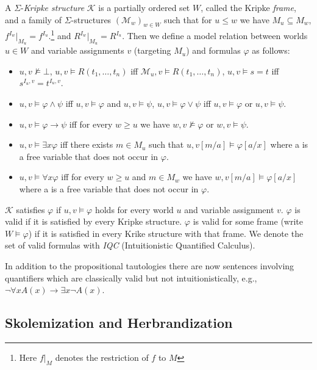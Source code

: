 \documentclass[runningheads]{llncs}
\begin{document}
\begin{definition}
	A $\Sigma$-\emph{Kripke structure} $\mathcal{K}$ is a partially ordered set $W$, called the Kripke \emph{frame}, and a family of $\Sigma$-structures $(\mathcal{M}_w)_{w\in W}$ such that for $u\leq w$ we have $M_u\subseteq M_w$, $f^{I_w}|_{M_u} = f^{I_u}$.\footnote{Here $f|_M$ denotes the restriction of $f$ to $M$} and $R^{I_w}|_{M_u} = R^{I_u}$.
	Then we define a model relation between worlds $u\in W$ and variable assignments $v$ (targeting $M_u$) and formulas $\varphi$ as follows:
	\begin{itemize}
		\item $u, v\not\models\bot$, $u, v\models R(t_1,\dots,t_n)$ iff $\mathcal M_u, v\models R(t_1,\dots,t_n)$, $u, v\models s = t$ iff $s^{I_u, v} = t^{I_u, v}$.
		\item $u, v\models \varphi\wedge \psi$ iff $u, v\models\varphi$ and $u, v\models\psi$, $u, v\models \varphi\vee\psi$ iff $u, v\models\varphi$ or $u, v\models\psi$.
		\item $u, v\models \varphi\to\psi$ iff for every $w\geq u$ we have $w, v\not\models\varphi$ or $w, v\models\psi$.
		\item $u, v\models\exists x\varphi$ iff there exists $m\in M_u$ such that $u, v[m/a]\models\varphi[a/x]$ where a is a free variable that does not occur in $\varphi$.
		\item $u, v\models\forall x\varphi$ iff for every $w\geq u$ and $m\in M_w$ we have $w, v[m/a]\models\varphi[a/x]$ where a is a free variable that does not occur in $\varphi$.
	\end{itemize}
	$\mathcal{K}$ satisfies $\varphi$ if $u, v\models\varphi$ holds for every world $u$ and variable assignment $v$. $\varphi$ is valid if it is satisfied by every Kripke structure.
	$\varphi$ is valid for some frame (write $W\models\varphi$) if it is satisfied in every Krike structure with that frame. We denote the set of valid formulas with \emph{IQC} (Intuitionistic Quantified Calculus).
\end{definition}
In addition to the propositional tautologies there are now sentences involving quantifiers which are classically valid but not intuitionistically, e.g., $\neg\forall x A(x)\to \exists x \neg A(x)$.

\subsection{Skolemization and Herbrandization}\label{section:herbrandiaztion}
\end{document}
